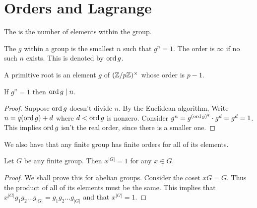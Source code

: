 \documentclass[11pt]{scrreport}
\begin{document}
\section{Orders and Lagrange}
\begin{definition}
    The  is the number of elements within the group.
\end{definition}
\begin{definition}
    The  $g$ within a group is the smallest $n$ such that $g^n=1$. The order is $\infty$ if no such $n$ exists. This is denoted by $\operatorname{ord} g$.
\end{definition}
\begin{example}
    A primitive root is an element $g$ of $(\mathbb Z/p\mathbb Z)^\times$ whose order is $p-1$.
\end{example}
\begin{proposition}
    If $g^n=1$ then $\operatorname{ord} g \mid n$. 
\end{proposition}
\begin{proof}
    Suppose $\operatorname{ord} g$ doesn't divide $n$. By the Euclidean algorithm, Write $n=q(\operatorname{ord} g)+d$ where $d<\operatorname{ord} g$ is nonzero. Consider $g^n=g^{(\operatorname{ord} g)^q}\cdot g^d = g^d = 1$. This implies $\operatorname{ord} g$ isn't the real order, since there is a smaller one.
\end{proof}
We also have that any finite group has finite orders for all of its elements.
\begin{theorem}
    Let $G$ be any finite group. Then $x^{|G|}=1$ for any $x\in G$.
\end{theorem}
\begin{proof}
    We shall prove this for abelian groups.
    Consider the coset $xG = G$. Thus the product of all of its elements must be the same. This implies that $x^{|G|}g_1g_2\dots g_{|G|} = g_1g_2\dots g_{|G|}$ and that $x^{|G|}=1$.
\end{proof}
\end{document}
